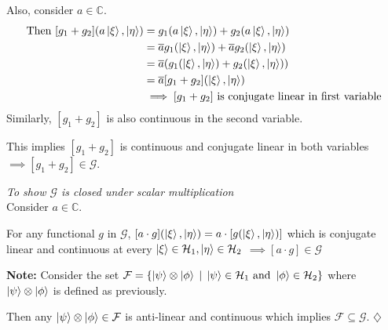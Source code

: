 \documentclass[12pt,twoside,fleqn]{report}
\makeatletter
\theoremstyle{thmstyle}
\renewenvironment{proof}[1][\proofname]{\par
\pushQED{\qed}%
\normalfont \topsep6\p@\@plus6\p@\relax
\trivlist
\item[\hskip\labelsep\itshape#1\@addpunct{.}]\mbox{}\par\nobreak\ignorespaces
}{%
    \popQED\endtrivlist\@endpefalse
    }
\newenvironment{note}{\textbf{Note:}}{\hfill\ensuremath{\diamondsuit}}
\makeatother
\begin{document}
\begin{proof}
    Also, consider $a \in \mathbb{C}$.
    \begin{align*}
        \text{Then }[g_1 + g_2](a \ket\xi, \ket\eta) & = g_1(a \ket\xi, \ket\eta) + g_2(a \ket\xi, \ket\eta)
        \\ & = \overline{a} g_1(\ket\xi, \ket\eta) + \overline{a} g_2(\ket\xi, \ket\eta)
        \\ & = \overline{a} (g_1(\ket\xi, \ket\eta) + g_2(\ket\xi,\ket\eta))
        \\ & = \overline{a}[g_1 + g_2](\ket\xi, \ket\eta)
        \\ & \implies [g_1 + g_2] \text{ is conjugate linear in first variable}
    \end{align*}
    Similarly, $[g_1 + g_2]$ is also continuous in the second variable.

    This implies $[g_1 + g_2]$ is continuous and conjugate linear in both variables $\implies [g_1 + g_2] \in \mathcal{G}$.



    \emph{To show $\mathcal{G}$ is closed under scalar multiplication} \\
    Consider $a \in \mathbb{C}$.

    For any functional $g$ in $\mathcal{G}$, $[a \cdot g](\ket\xi, \ket\eta) = a \cdot [ g(\ket\xi, \ket\eta) ]$ which is conjugate linear and continuous at every $\ket\xi \in \mathcal{H}_1, \ket\eta \in \mathcal{H}_2$ $\implies [a \cdot g] \in \mathcal{G}$
\end{proof}

\begin{note}
    Consider the set $\mathcal{F} = \{ \ket\psi \otimes \ket\phi \; | \; \ket\psi \in \mathcal{H}_1 \text{ and } \ket\phi \in \mathcal{H}_2 \}$ where $\ket\psi \otimes \ket\phi$ is defined as previously.

    Then any $\ket\psi \otimes \ket\phi \in \mathcal{F}$ is anti-linear and continuous which implies $\mathcal{F} \subseteq \mathcal{G}$.
\end{note}
\end{document}
